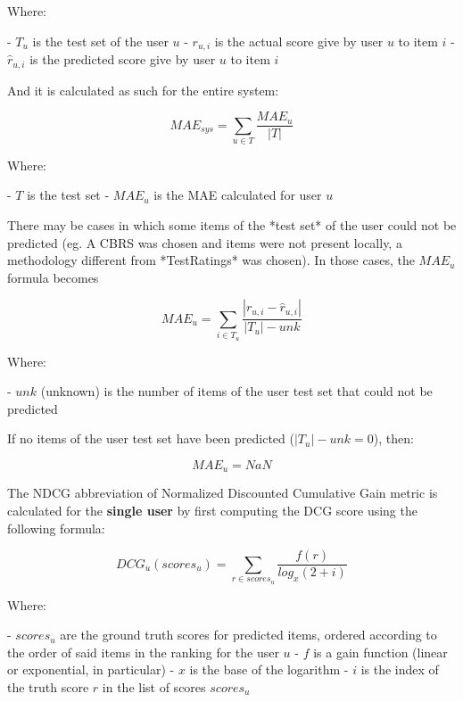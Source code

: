 \documentclass[11pt]{article}
\begin{document}
    Where:

    - $T_u$ is the test set of the user $u$
    - $r_{u, i}$ is the actual score give by user $u$ to item $i$
    - $\hat{r}_{u, i}$ is the predicted score give by user $u$ to item $i$

\hfill\break

And it is calculated as such for the entire system:

    \[
    MAE_{sys} = \sum_{u \in T} \frac{MAE_u}{|T|}
    \]

    Where:

    - $T$ is the test set
    - $MAE_u$ is the MAE calculated for user $u$

\hfill\break

There may be cases in which some items of the *test set* of the user could not be predicted (eg. A CBRS was chosen
and items were not present locally, a methodology different from *TestRatings* was chosen).
In those cases, the $MAE_u$ formula becomes

    \[
    MAE_u = \sum_{i \in T_u} \frac{|r_{u,i} - \hat{r}_{u,i}|}{|T_u| - unk}
    \]

    Where:

    - $unk$ (unknown) is the number of items of the user test set that could not be predicted

    If no items of the user test set have been predicted ($|T_u| - unk = 0$), then:

    \[
    MAE_u = NaN
    \]

\hfill\break




The NDCG abbreviation of Normalized Discounted Cumulative Gain metric is calculated for the \textbf{single user}
by first computing the DCG score using the following formula:

    \[
    DCG_{u}(scores_{u}) = \sum_{r\in scores_{u}}{\frac{f(r)}{log_x(2 + i)}}
    \]

    Where:

    - $scores_{u}$ are the ground truth scores for predicted items, ordered according to the order of said items in the
        ranking for the user $u$
    - $f$ is a gain function (linear or exponential, in particular)
    - $x$ is the base of the logarithm
    - $i$ is the index of the truth score $r$ in the list of scores $scores_{u}$
\end{document}
